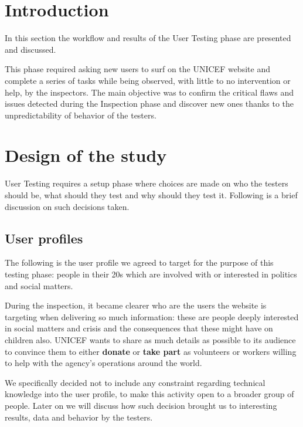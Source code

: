 \section{Introduction}
In this section the workflow and results of the User Testing phase are presented and discussed.

This phase required asking new users to surf on the UNICEF website and complete a series of tasks while being observed, with little to no intervention or help, by the inspectors. The main objective was to confirm the critical flaws and issues detected during the Inspection phase and discover new ones thanks to the unpredictability of behavior of the testers.

\section{Design of the study}
User Testing requires a setup phase where choices are made on who the testers should be, what should they test and why should they test it. Following is a brief discussion on such decisions taken.

\subsection{User profiles}
The following is the user profile we agreed to target for the purpose of this testing phase: people in their 20s which are involved with or interested in politics and social matters.

During the inspection, it became clearer who are the users the website is targeting when delivering so much information: these are people deeply interested in social matters and crisis and the consequences that these might have on children also. UNICEF wants to share as much details as possible to its audience to convince them to either \textbf{donate} or \textbf{take part} as volunteers or workers willing to help with the agency's operations around the world.

We specifically decided not to include any constraint regarding technical knowledge into the user profile, to make this activity open to a broader group of people. Later on we will discuss how such decision brought us to interesting results, data and behavior by the testers.

